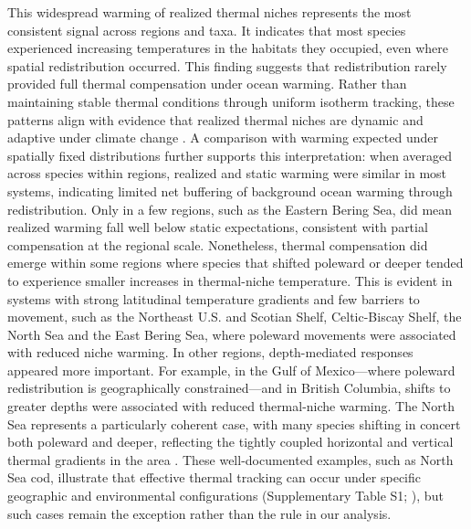 \documentclass[pdflatex,sn-nature,referee]{sn-jnl}%
\begin{document}
This widespread warming of realized thermal niches represents the most consistent signal across regions and taxa. It indicates that most species experienced increasing temperatures in the habitats they occupied, even where spatial redistribution occurred. This finding suggests that redistribution rarely provided full thermal compensation under ocean warming. Rather than maintaining stable thermal conditions through uniform isotherm tracking, these patterns align with evidence that realized thermal niches are dynamic and adaptive under climate change \citep{fredston_range_2021, ward_win_2024}. A comparison with warming expected under spatially fixed distributions further supports this interpretation: when averaged across species within regions, realized and static warming were similar in most systems, indicating limited net buffering of background ocean warming through redistribution. Only in a few regions, such as the Eastern Bering Sea, did mean realized warming fall well below static expectations, consistent with partial compensation at the regional scale. Nonetheless, thermal compensation did emerge within some regions where species that shifted poleward or deeper tended to experience smaller increases in thermal-niche temperature. This is evident in systems with strong latitudinal temperature gradients and few barriers to movement, such as the Northeast U.S. and Scotian Shelf, Celtic-Biscay Shelf, the North Sea and the East Bering Sea, where poleward movements were associated with reduced niche warming. In other regions, depth-mediated responses appeared more important. For example, in the Gulf of Mexico---where poleward redistribution is geographically constrained---and in British Columbia, shifts to greater depths were associated with reduced thermal-niche warming. The North Sea represents a particularly coherent case, with many species shifting in concert both poleward and deeper, reflecting the tightly coupled horizontal and vertical thermal gradients in the area \citep{ices_atlas_north_sea_1993}. These well-documented examples, such as North Sea cod, illustrate that effective thermal tracking can occur under specific geographic and environmental configurations (Supplementary Table S1; \citealp{perry_climate_2005, engelhard_climate_2014}), but such cases remain the exception rather than the rule in our analysis.
\end{document}
